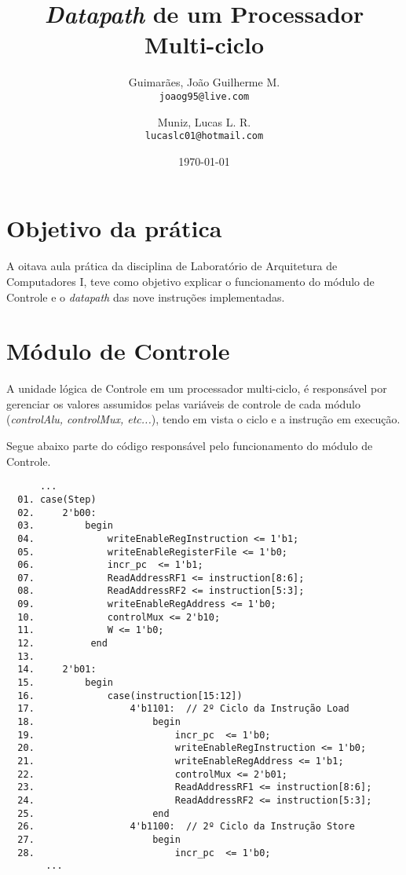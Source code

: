 \documentclass[12pt, a4paper]{article}
\title{\textbf{\textit{Datapath} de um Processador Multi-ciclo}}
\author{
	Guimarães, João Guilherme M.\\
	\texttt{joaog95@live.com}
	\and
	Muniz, Lucas L. R.\\
	\texttt{lucaslc01@hotmail.com}
}
\date{\today}
\begin{document}
	\maketitle
	
	\vspace{1cm}
	
	\section{Objetivo da prática}
	
	\par A oitava aula prática da disciplina de Laboratório de Arquitetura de Computadores I, teve como objetivo explicar o funcionamento do módulo de Controle e o \textit{datapath} das nove instruções implementadas.
	
	\section{Módulo de Controle}
	
	\par A unidade lógica de Controle em um processador multi-ciclo, é responsável por gerenciar os valores assumidos pelas variáveis de controle de cada módulo (\textit{controlAlu, controlMux, etc...}), tendo em vista o ciclo e a instrução em execução. \newline
	
	\par Segue abaixo parte do código responsável pelo funcionamento do módulo de Controle.
	
	\begin{verbatim}
      ...
  01. case(Step)
  02.     2'b00:
  03.         begin
  04.             writeEnableRegInstruction <= 1'b1;
  05.             writeEnableRegisterFile <= 1'b0;
  06.             incr_pc  <= 1'b1;
  07.             ReadAddressRF1 <= instruction[8:6];
  08.             ReadAddressRF2 <= instruction[5:3];
  09.             writeEnableRegAddress <= 1'b0;
  10.             controlMux <= 2'b10;
  11.             W <= 1'b0;
  12.          end
  13.
  14.     2'b01:
  15.         begin
  16.             case(instruction[15:12])
  17.                 4'b1101:  // 2º Ciclo da Instrução Load
  18.                     begin
  19.                         incr_pc  <= 1'b0;
  20.                         writeEnableRegInstruction <= 1'b0;  
  21.                         writeEnableRegAddress <= 1'b1;
  22.                         controlMux <= 2'b01;
  23.                         ReadAddressRF1 <= instruction[8:6];
  24.                         ReadAddressRF2 <= instruction[5:3];      
  25.                     end
  26.                 4'b1100:  // 2º Ciclo da Instrução Store
  27.                     begin
  28.                         incr_pc  <= 1'b0;
       ...
	\end{verbatim}
	
\end{document}

